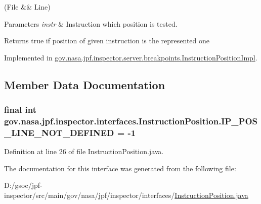(File \&\& Line)


\begin{DoxyParams}{Parameters}
{\em instr} & Instruction which position is tested. \\
\hline
\end{DoxyParams}
\begin{DoxyReturn}{Returns}
true if position of given instruction is the represented one 
\end{DoxyReturn}


Implemented in \hyperlink{classgov_1_1nasa_1_1jpf_1_1inspector_1_1server_1_1breakpoints_1_1_instruction_position_impl_a684f11d2a16eafa3bac9e4f7e62fc0e1}{gov.\+nasa.\+jpf.\+inspector.\+server.\+breakpoints.\+Instruction\+Position\+Impl}.



\subsection{Member Data Documentation}
\subsubsection[{\texorpdfstring{I\+P\+\_\+\+P\+O\+S\+\_\+\+L\+I\+N\+E\+\_\+\+N\+O\+T\+\_\+\+D\+E\+F\+I\+N\+ED}{IP_POS_LINE_NOT_DEFINED}}]{\setlength{\rightskip}{0pt plus 5cm}final int gov.\+nasa.\+jpf.\+inspector.\+interfaces.\+Instruction\+Position.\+I\+P\+\_\+\+P\+O\+S\+\_\+\+L\+I\+N\+E\+\_\+\+N\+O\+T\+\_\+\+D\+E\+F\+I\+N\+ED = -\/1\hspace{0.3cm}{\ttfamily [static]}}\hypertarget{interfacegov_1_1nasa_1_1jpf_1_1inspector_1_1interfaces_1_1_instruction_position_af542a3a926e7a0ef8ad18bde5ee98634}{}\label{interfacegov_1_1nasa_1_1jpf_1_1inspector_1_1interfaces_1_1_instruction_position_af542a3a926e7a0ef8ad18bde5ee98634}


Definition at line 26 of file Instruction\+Position.\+java.



The documentation for this interface was generated from the following file\+:\begin{DoxyCompactItemize}
\item 
D\+:/gsoc/jpf-\/inspector/src/main/gov/nasa/jpf/inspector/interfaces/\hyperlink{_instruction_position_8java}{Instruction\+Position.\+java}\end{DoxyCompactItemize}
